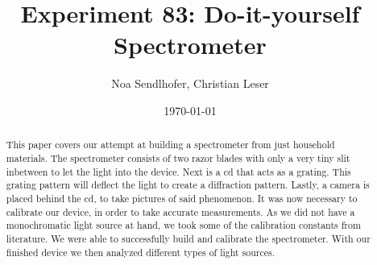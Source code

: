\documentclass[12pt,a4paper]{article}
\title{Experiment 83: Do-it-yourself Spectrometer}
\author{Noa Sendlhofer, Christian Leser}
\date{\today}
\begin{document}
\maketitle

\begin{abstract}
    This paper covers our attempt at building a spectrometer from just household materials. 
    The spectrometer consists of two razor blades with only a very tiny slit inbetween to let the light
    into the device. Next is a cd that acts as a grating. This grating pattern will deflect the light to create
    a diffraction pattern. Lastly, a camera is placed behind the cd, to take pictures of said phenomenon.
    It was now necessary to calibrate our device, in order to take accurate measurements. As we did not have a 
    monochromatic light source at hand, we took some of the calibration constants from literature.
    We were able to successfully build and calibrate the spectrometer. With our finished device we then analyzed
    different types of light sources.
\end{abstract}

\tableofcontents

\newpage



\newpage




\newpage


\end{document}
